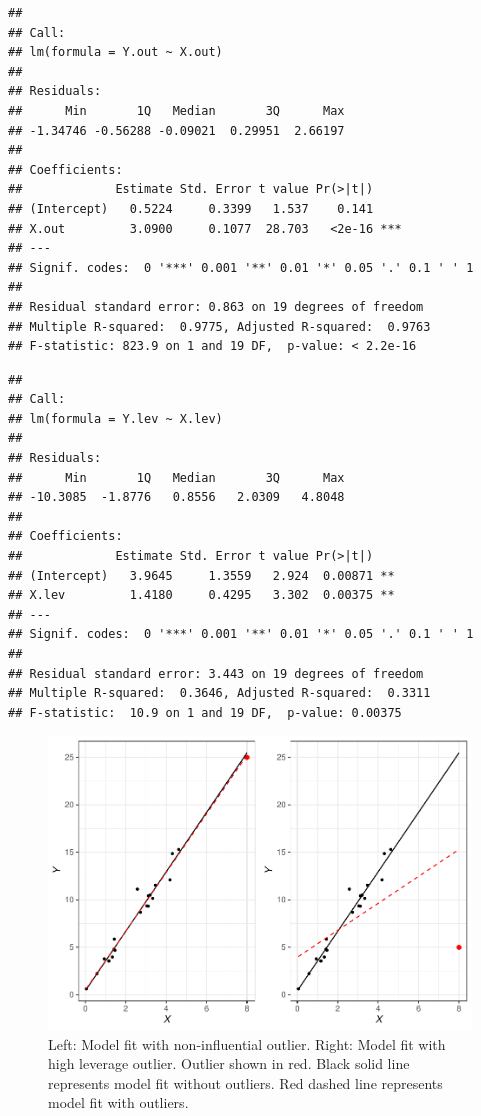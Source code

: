 \documentclass[
]{book}
\begin{document}
\begin{verbatim}
## 
## Call:
## lm(formula = Y.out ~ X.out)
## 
## Residuals:
##      Min       1Q   Median       3Q      Max 
## -1.34746 -0.56288 -0.09021  0.29951  2.66197 
## 
## Coefficients:
##             Estimate Std. Error t value Pr(>|t|)    
## (Intercept)   0.5224     0.3399   1.537    0.141    
## X.out         3.0900     0.1077  28.703   <2e-16 ***
## ---
## Signif. codes:  0 '***' 0.001 '**' 0.01 '*' 0.05 '.' 0.1 ' ' 1
## 
## Residual standard error: 0.863 on 19 degrees of freedom
## Multiple R-squared:  0.9775, Adjusted R-squared:  0.9763 
## F-statistic: 823.9 on 1 and 19 DF,  p-value: < 2.2e-16
\end{verbatim}

\begin{verbatim}
## 
## Call:
## lm(formula = Y.lev ~ X.lev)
## 
## Residuals:
##      Min       1Q   Median       3Q      Max 
## -10.3085  -1.8776   0.8556   2.0309   4.8048 
## 
## Coefficients:
##             Estimate Std. Error t value Pr(>|t|)   
## (Intercept)   3.9645     1.3559   2.924  0.00871 **
## X.lev         1.4180     0.4295   3.302  0.00375 **
## ---
## Signif. codes:  0 '***' 0.001 '**' 0.01 '*' 0.05 '.' 0.1 ' ' 1
## 
## Residual standard error: 3.443 on 19 degrees of freedom
## Multiple R-squared:  0.3646, Adjusted R-squared:  0.3311 
## F-statistic:  10.9 on 1 and 19 DF,  p-value: 0.00375
\end{verbatim}

\begin{figure}

{\centering \includegraphics[width=1\linewidth]{The_Fundamentals_of_People_Analytics_files/figure-latex/high-leverage-1} 

}

\caption{Left: Model fit with non-influential outlier. Right: Model fit with high leverage outlier. Outlier shown in red. Black solid line represents model fit without outliers. Red dashed line represents model fit with outliers.}\label{fig:high-leverage}
\end{figure}
\end{document}
